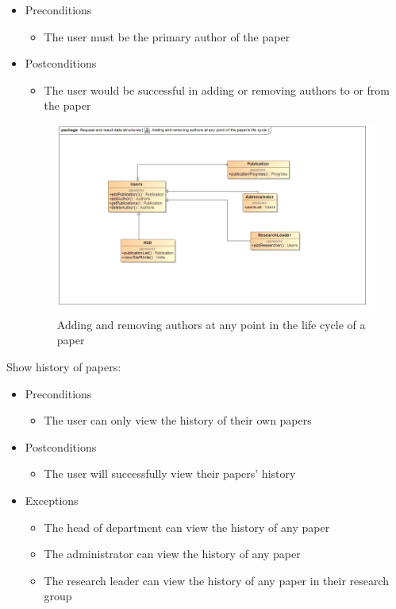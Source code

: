 \documentclass[a4paper,12pt]{article}
\begin{document}
\begin{itemize}
    \item Preconditions
    \begin{itemize}
        \item The user must be the primary author of the paper
    \end{itemize}
    \item Postconditions
    \begin{itemize}
        \item The user would be successful in adding or removing authors to or from the paper
    \end{itemize}
    
    \begin{figure}[H]
    \centering
    \caption{Adding and removing authors at any point in the life cycle of a paper}
    \includegraphics[width=1\textwidth]{use-case/adding-and-removing-authors.png}
    \end{figure}
\end{itemize}
Show history of papers:
\begin{itemize}
    \item Preconditions
    \begin{itemize}
        \item The user can only view the history of their own papers
    \end{itemize}
    \item Postconditions
    \begin{itemize}
        \item The user will successfully view their papers' history
    \end{itemize}
    \item Exceptions
    \begin{itemize}
        \item The head of department can view the history of any paper
        \item The administrator can view the history of any paper
        \item The research leader can view the history of any paper in their research group
    \end{itemize}
\end{itemize}
\end{document}
